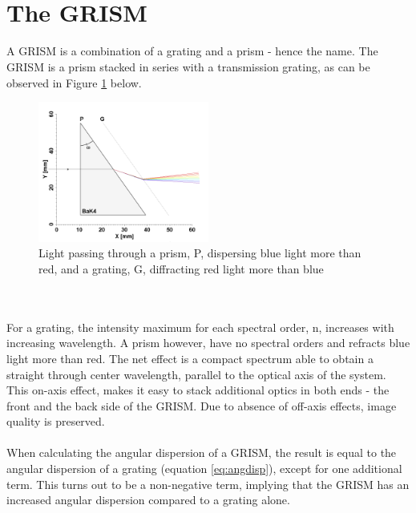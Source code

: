 \\\\
\section{The GRISM} \label{sec:grism}
A GRISM is a combination of a grating and a prism - hence the name. The GRISM is a prism stacked in series with a transmission grating, as can be observed in Figure \ref{fig:grism} below.
\begin{figure}[H]
    \centering
    \includegraphics[width=0.5\textwidth]{Images/theory/GRISM.png}
    \caption{Light passing through a prism, P, dispersing blue light more than red, and a grating, G, diffracting red light more than blue}
    \label{fig:grism}
\end{figure}
\\\\
\noindent
For a grating, the intensity maximum for each spectral order, n, increases with increasing wavelength. A prism however, have no spectral orders and refracts blue light more than red. The net effect is a compact spectrum able to obtain a straight through center wavelength, parallel to the optical axis of the system. This on-axis effect, makes it easy to stack additional optics in both ends - the front and the back side of the GRISM. Due to absence of off-axis effects, image quality is preserved.
\\\\
When calculating the angular dispersion of a GRISM, the result is equal to the angular dispersion of a grating (equation \ref{eq:angdisp}), except for one additional term. This turns out to be a non-negative term, implying that the GRISM has an increased angular dispersion compared to a grating alone.

\vspace{1.3cm}

